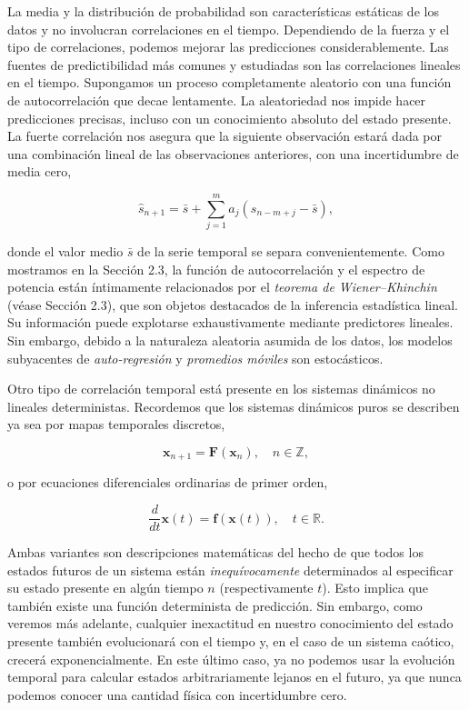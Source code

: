 \documentclass[10pt,a4paper]{book}
\begin{document}
\bigskip

La media y la distribución de probabilidad son características estáticas de los datos y no involucran correlaciones en el tiempo. Dependiendo de la fuerza y el tipo de correlaciones, podemos mejorar las predicciones considerablemente. Las fuentes de predictibilidad más comunes y estudiadas son las correlaciones lineales en el tiempo. Supongamos un proceso completamente aleatorio con una función de autocorrelación que decae lentamente. La aleatoriedad nos impide hacer predicciones precisas, incluso con un conocimiento absoluto del estado presente. La fuerte correlación nos asegura que la siguiente observación estará dada por una combinación lineal de las observaciones anteriores, con una incertidumbre de media cero,

\begin{equation}
\hat{s}_{n+1} = \bar{s} + \sum_{j=1}^{m} a_j (s_{n-m+j} - \bar{s}), 
\end{equation}

donde el valor medio $\bar{s}$ de la serie temporal se separa convenientemente. Como mostramos en la Sección 2.3, la función de autocorrelación y el espectro de potencia están íntimamente relacionados por el \textit{teorema de Wiener–Khinchin} (véase Sección 2.3), que son objetos destacados de la inferencia estadística lineal. Su información puede explotarse exhaustivamente mediante predictores lineales. Sin embargo, debido a la naturaleza aleatoria asumida de los datos, los modelos subyacentes de \textit{auto-regresión} y \textit{promedios móviles} son estocásticos.

Otro tipo de correlación temporal está presente en los sistemas dinámicos no lineales deterministas. Recordemos que los sistemas dinámicos puros se describen ya sea por mapas temporales discretos,  

\begin{equation}
\mathbf{x}_{n+1} = \mathbf{F}(\mathbf{x}_n), \quad n \in \mathbb{Z}, 
\end{equation}

o por ecuaciones diferenciales ordinarias de primer orden,  

\begin{equation}
\frac{d}{dt} \mathbf{x}(t) = \mathbf{f}(\mathbf{x}(t)), \quad t \in \mathbb{R}.
\end{equation}

Ambas variantes son descripciones matemáticas del hecho de que todos los estados futuros de un sistema están \textit{inequívocamente} determinados al especificar su estado presente en algún tiempo $n$ (respectivamente $t$). Esto implica que también existe una función determinista de predicción. Sin embargo, como veremos más adelante, cualquier inexactitud en nuestro conocimiento del estado presente también evolucionará con el tiempo y, en el caso de un sistema caótico, crecerá exponencialmente. En este último caso, ya no podemos usar la evolución temporal para calcular estados arbitrariamente lejanos en el futuro, ya que nunca podemos conocer una cantidad física con incertidumbre cero.  
\end{document}
